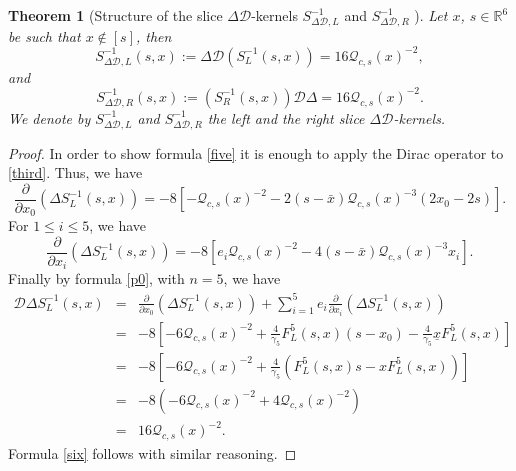 \documentclass[reqno,11pt]{amsart}
\numberwithin{equation}{section}
\newcommand{\bigD}{\mathcal{D}}
\newtheorem{theorem}{Theorem}[section]
\theoremstyle{definition}
\begin{document}
\begin{theorem}[Structure of the slice $ \Delta\mathcal{D}$-kernels $S^{-1}_{\Delta\mathcal{D},L}$ and $S^{-1}_{\Delta\mathcal{D},R}$ ]
	\label{app3}
	Let $x$, $s \in \mathbb{R}^6$ be such that $x \notin [s]$, then
	\begin{equation}
		\label{five}
		S^{-1}_{\Delta\bigD ,L}(s,x):=\Delta \mathcal{D} \left(S^{-1}_L(s,x)\right)=16 \mathcal{Q}_{c,s}(x)^{-2},
	\end{equation}
	and
	\begin{equation}
		\label{six}
		S^{-1}_{\Delta\bigD ,R}(s,x):=\left(S^{-1}_R(s,x)\right)\mathcal{D} \Delta=16 \mathcal{Q}_{c,s}(x)^{-2}.
	\end{equation}
	We denote by $S^{-1}_{\Delta\mathcal{D},L}$ and $S^{-1}_{\Delta\mathcal{D},R}$ the left and the right slice $ \Delta\mathcal{D}$-kernels.
\end{theorem}
\begin{proof}
	In order to show formula \eqref{five} it is enough to apply the Dirac operator to \eqref{third}. Thus, we have
	$$\frac{\partial}{\partial x_0} \left( \Delta S^{-1}_L(s,x)\right)=-8[-\mathcal{Q}_{c,s}(x)^{-2}-2(s- \bar{x}) \mathcal{Q}_{c,s}(x)^{-3}(2x_0-2s)].$$
	For $1 \leq i \leq 5$, we have
	$$\frac{\partial}{\partial x_i} \left( \Delta S^{-1}_L(s,x)\right)=-8[e_i\mathcal{Q}_{c,s}(x)^{-2}-4(s- \bar{x}) \mathcal{Q}_{c,s}(x)^{-3}x_i].$$
	Finally by formula \eqref{p0}, with $n=5$, we have
	\begin{eqnarray*}
		\mathcal{D} \Delta S^{-1}_L(s,x)&=& \frac{\partial}{\partial x_0} \left( \Delta S^{-1}_L(s,x)\right)+ \sum_{i=1}^5 e_i \frac{\partial}{\partial x_i} \left( \Delta S^{-1}_L(s,x)\right)\\
		&=&-8[-6 \mathcal{Q}_{c,s}(x)^{-2}+\frac{4}{\gamma_5} F_{L}^5(s,x)(s-x_0)- \frac{4}{\gamma_5} \underline{x} F_L^5(s,x)]\\
		&=& -8 \left[-6 \mathcal{Q}_{c,s}(x)^{-2}+ \frac{4}{\gamma_5} \left( F_L^5(s,x)s-x F_L^5(s,x)\right)\right]\\
		&=&-8 \left(-6 \mathcal{Q}_{c,s}(x)^{-2}+4 \mathcal{Q}_{c,s}(x)^{-2}\right)\\
		&=& 16 \mathcal{Q}_{c,s}(x)^{-2}.
	\end{eqnarray*}
	Formula \eqref{six} follows with similar reasoning.
	
\end{proof}
\end{document}
